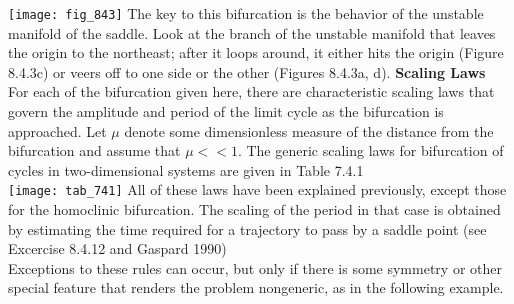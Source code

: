\documentclass{article}
\newcommand\tab[1][1cm]{\hspace*{#1}}
\begin{document}
\texttt{[image: fig\_843]}
\tab The key to this bifurcation is the behavior of the unstable manifold of the saddle. Look at the branch of the unstable manifold that leaves the origin to the northeast; after it loops around, it either hits the origin (Figure 8.4.3c) or veers off to one side or the other (Figures 8.4.3a, d). 
\textbf {Scaling Laws} \\ \tab
For each of the bifurcation given here, there are characteristic scaling laws that govern the amplitude and period of the limit cycle as the bifurcation is approached. Let $\mu$ denote some dimensionless measure of the distance from the bifurcation and assume that $\mu << 1$. The generic scaling laws for bifurcation of cycles in two-dimensional systems are given in Table 7.4.1 \\
\texttt{[image: tab\_741]}
\tab All of these laws have been explained previously, except those for the homoclinic bifurcation. The scaling of the period in that case is obtained by estimating the time required for a trajectory to pass by a saddle point (see Excercise 8.4.12 and Gaspard 1990) \\ \tab
Exceptions to these rules can occur, but only if there is some symmetry or other special feature that renders the problem nongeneric, as in the following example.
\end{document}
